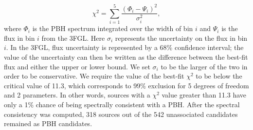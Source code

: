 \noindent
\begin{equation}
\chi^2 = \sum_{i = 1}^{5} \frac{(\Phi_i-\Psi_i )^2}{\sigma_i^2}, 
\end{equation}
where $\Phi_i$ is the PBH spectrum integrated over the width of bin $i$ and $\Psi_i$ is the flux in bin $i$ from the 3FGL. Here $\sigma_i$ represents the uncertainty on the flux in bin $i$.
In the 3FGL, flux uncertainty is represented by a 68\% confidence interval; the value of the uncertainty can then be written as the difference between the best-fit flux and either the upper or lower bound.
We set $\sigma_i$ to be the larger of the two in order to be conservative.
We require the value of the best-fit $\chi^2$ to be below the critical value of 11.3, which corresponds to 99\% exclusion for 5 degrees of freedom and 2 parameters. In other words, sources with a $\chi ^2$ value greater than 11.3 have only a 1\% chance of being spectrally consistent with a PBH. After the spectral consistency was computed, 318 sources out of the 542 unassociated candidates remained as PBH candidates.

